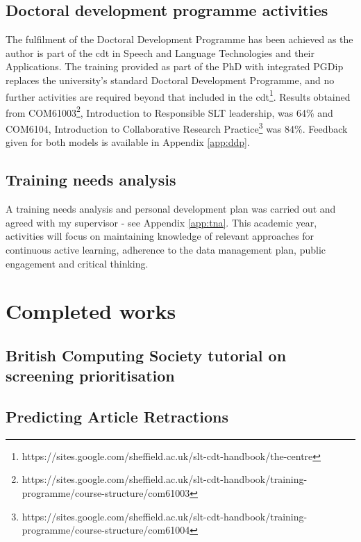 \documentclass[10pt,oneside]{book}
\begin{document}
\section{Doctoral development programme activities}

The fulfilment of the Doctoral Development Programme has been achieved as the author is part of the \gls*{cdt} in Speech and Language Technologies and their Applications. The training provided as part of the PhD with integrated PGDip replaces the university's standard Doctoral Development Programme, and no further activities are required beyond that included in the \gls*{cdt}\footnote{https://sites.google.com/sheffield.ac.uk/slt-cdt-handbook/the-centre}. Results obtained from COM61003\footnote{https://sites.google.com/sheffield.ac.uk/slt-cdt-handbook/training-programme/course-structure/com61003}, Introduction to Responsible SLT leadership, was 64\% and COM6104, Introduction to Collaborative Research Practice\footnote{https://sites.google.com/sheffield.ac.uk/slt-cdt-handbook/training-programme/course-structure/com61004} was 84\%. Feedback given for both models is available in Appendix \ref{app:ddp}.

\section{Training needs analysis}

A training needs analysis and personal development plan was carried out and agreed with my supervisor - see Appendix \ref{app:tna}. This academic year, activities will focus on maintaining knowledge of relevant approaches for continuous active learning, adherence to the data management plan, public engagement and critical thinking.

\printbibliography[title={References}]

\appendix
\appendixpage 
\chapter{Completed works}
\section{British Computing Society tutorial on screening prioritisation}

\label{app:Screening_Prioritisation}

\section{Predicting Article Retractions}

\label{app:Predicting_article_retractions}
\end{document}
